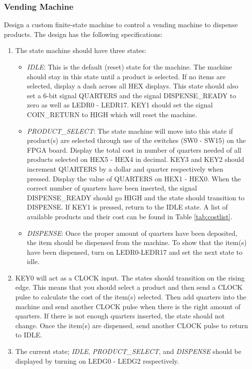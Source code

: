 \subsubsection{Vending Machine}

Design a custom finite-state machine to control a vending machine to dispense products. The design has the following specifications:

\begin{enumerate} 

	\item The state machine should have three states:

	\begin{itemize}
		\item \emph{IDLE}: This is the default (reset) state for the machine. The machine should stay in this state until a product is selected. If no items are selected, display a dash across all HEX displays. This state should also set a 6-bit signal QUARTERS and the signal DISPENSE\_READY to zero as well as LEDR0 - LEDR17. KEY1 should set the signal COIN\_RETURN to HIGH which will reset the machine.

		\item \emph{PRODUCT\_SELECT}: The state machine will move into this state if product(s) are selected through use of the switches (SW0 - SW15) on the FPGA board. Display the total cost in number of quarters needed of all products selected on HEX5 - HEX4 in decimal.  KEY3 and KEY2 should increment QUARTERS by a dollar and quarter respectively when pressed. Display the value of QUARTERS on HEX1 - HEX0. When the correct number of quarters have been inserted, the signal DISPENSE\_READY should go HIGH and the state should transition to DISPENSE. If KEY1 is pressed, return to the IDLE state. A list of available products and their cost can be found in Table \ref{tab:costlist}.

		\item \emph{DISPENSE}: Once the proper amount of quarters have been deposited, the item should be dispensed from the machine. To show that the item(s) have been dispensed, turn on LEDR0-LEDR17 and set the next state to idle.

	\end{itemize}
	
	\item KEY0 will act as a CLOCK input. The states should transition on the rising edge. This means that you should select a product and then send a CLOCK pulse to calculate the cost of the item(s) selected. Then add quarters into the machine and send another CLOCK pulse when there is the right amount of quarters. If there is not enough quarters inserted, the state should not change. Once the item(s) are dispensed, send another CLOCK pulse to return to IDLE.

	\item The current state; \emph{IDLE}, \emph{PRODUCT\_SELECT}, and \emph{DISPENSE} should be displayed by turning on LEDG0 - LEDG2 respectively.
	
\end{enumerate}

